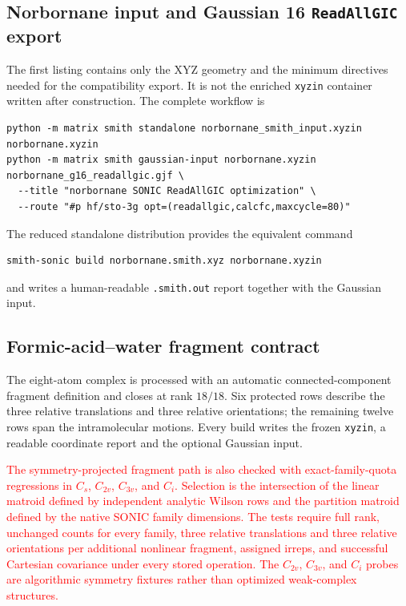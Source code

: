 \documentclass[10pt]{article}
\begin{document}
\subsection{Norbornane input and Gaussian 16 \texttt{ReadAllGIC} export}

The first listing contains only the XYZ geometry and the minimum directives
needed for the compatibility export.  It is not the enriched \texttt{xyzin}
container written after construction.  The complete workflow is

\begin{lstlisting}
python -m matrix smith standalone norbornane_smith_input.xyzin norbornane.xyzin
python -m matrix smith gaussian-input norbornane.xyzin norbornane_g16_readallgic.gjf \
  --title "norbornane SONIC ReadAllGIC optimization" \
  --route "#p hf/sto-3g opt=(readallgic,calcfc,maxcycle=80)"
\end{lstlisting}

The reduced standalone distribution provides the equivalent command
\begin{lstlisting}
smith-sonic build norbornane.smith.xyz norbornane.xyzin
\end{lstlisting}
and writes a human-readable \texttt{.smith.out} report together with the
Gaussian input.





\subsection{Formic-acid--water fragment contract}

The eight-atom complex is processed with an automatic connected-component
fragment definition and closes at rank \(18/18\).  Six protected rows describe
the three relative translations and three relative orientations; the remaining
twelve rows span the intramolecular motions.  Every build writes the frozen
\texttt{xyzin}, a readable coordinate report and the optional Gaussian input.

\textcolor{red}{The symmetry-projected fragment path is also checked with
exact-family-quota regressions in \(C_s\), \(C_{2v}\), \(C_{3v}\), and
\(C_i\).  Selection is the intersection of the linear matroid defined by
independent analytic Wilson rows and the partition matroid defined by the
native SONIC family dimensions.  The tests require full rank, unchanged counts
for every family, three relative translations and three relative orientations
per additional nonlinear fragment, assigned irreps, and successful Cartesian
covariance under every stored operation.  The \(C_{2v}\), \(C_{3v}\), and
\(C_i\) probes are algorithmic symmetry fixtures rather than optimized
weak-complex structures.}
\end{document}
